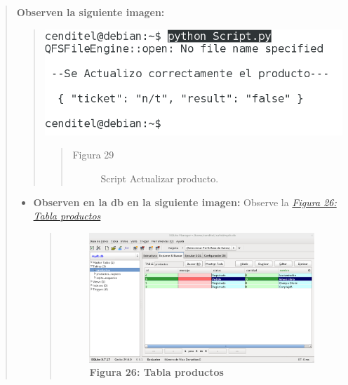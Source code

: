 \documentclass[letterpaper,11pt,spanish]{sphinxmanual}
\begin{document}
\begin{quote}
\textbf{Observen la siguiente imagen:}
\begin{quote}

{\hfill\includegraphics{Modificar.png}\hfill}
\begin{quote}\begin{description}
\item[{Figura 29}] \leavevmode
Script Actualizar producto.

\end{description}\end{quote}
\end{quote}
\begin{itemize}
\item {} 
\textbf{Observen en la db en la siguiente imagen:} Observe la {\hyperref[_templates/Contenido6/Parte2:figura6]{\emph{Figura 26: Tabla productos}}}
\begin{quote}
\begin{figure}[htbp]
\centering
\capstart

\includegraphics{Modificar1.png}
\caption{\textbf{Figura 26: Tabla productos}}\label{_templates/Contenido6/Parte2:figura6}\end{figure}
\end{quote}

\end{itemize}


\end{quote}
\end{document}
